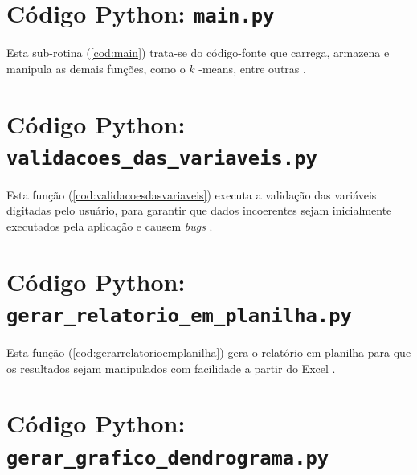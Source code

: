 \documentclass[12pt]{article} %
\begin{document}
	
	
	\else
	\if{}
	
	\newpage
	\section{Código Python: \texttt{main.py}}\label{apx:main}
	
	Esta sub-rotina (\ref{cod:main}) trata-se do código-fonte que carrega, armazena e manipula as demais funções, como o $ k $ -means, entre outras \cite{Kiusalaas2010, Langtangen2009, McKinney2018, McKinney2018a, Ramalho2018, Grus2009}.
	
	\label{cod:main}
	
	\section{Código Python: \texttt{validacoes\_das\_variaveis.py}}
	\label{apx:validacoesdasvariaveis}
	
	Esta função (\ref{cod:validacoesdasvariaveis}) executa a validação das variáveis digitadas pelo usuário, para garantir que dados incoerentes sejam inicialmente executados pela aplicação e causem \textit{bugs} \cite{Kiusalaas2010, Langtangen2009, McKinney2018, McKinney2018a, Ramalho2018, Grus2009}.
	
	\label{cod:validacoesdasvariaveis}
	
	\section{Código Python: \texttt{gerar\_relatorio\_em\_planilha.py}}\label{apx:gerar_relatorio_em_planilha}
	
	Esta função (\ref{cod:gerarrelatorioemplanilha}) gera o relatório em planilha para que os resultados sejam manipulados com facilidade a partir do Excel \cite{McKinney2018, McKinney2018a, Ramalho2018, Grus2009}.
	
	\label{cod:gerarrelatorioemplanilha}
	
	\section{Código Python: \texttt{gerar\_grafico\_dendrograma.py}}\label{apx:gerar_grafico_dendrograma}
	
\end{document}
